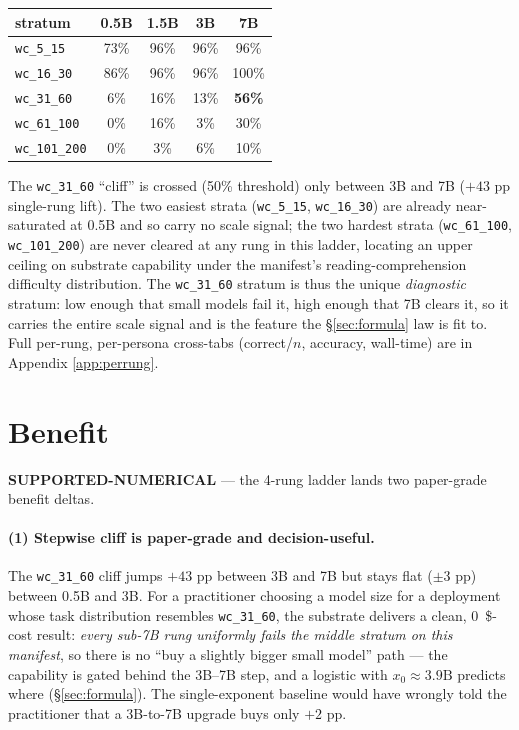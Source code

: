 \documentclass[11pt,a4paper]{article}
\newcommand{\green}[1]{\textcolor{green!50!black}{\textbf{#1}}}
\begin{document}
\begin{center}
\begin{tabular}{lcccc}
\toprule
stratum         & 0.5B  & 1.5B  & 3B    & 7B \\
\midrule
\texttt{wc\_5\_15}     & 73\% & 96\% & 96\% & 96\% \\
\texttt{wc\_16\_30}    & 86\% & 96\% & 96\% & 100\% \\
\texttt{wc\_31\_60}    & 6\%  & 16\% & 13\% & \textbf{56\%} \\
\texttt{wc\_61\_100}   & 0\%  & 16\% & 3\%  & 30\% \\
\texttt{wc\_101\_200}  & 0\%  & 3\%  & 6\%  & 10\% \\
\bottomrule
\end{tabular}
\end{center}

The \texttt{wc\_31\_60} ``cliff'' is crossed (50\% threshold) only between 3B
and 7B (\(+43\) pp single-rung lift). The two easiest strata
(\texttt{wc\_5\_15}, \texttt{wc\_16\_30}) are already near-saturated at 0.5B
and so carry no scale signal; the two hardest strata (\texttt{wc\_61\_100},
\texttt{wc\_101\_200}) are never cleared at any rung in this ladder, locating
an upper ceiling on substrate capability under the manifest's
reading-comprehension difficulty distribution. The \texttt{wc\_31\_60}
stratum is thus the unique \emph{diagnostic} stratum: low enough that small
models fail it, high enough that 7B clears it, so it carries the entire scale
signal and is the feature the §\ref{sec:formula} law is fit to. Full
per-rung, per-persona cross-tabs (correct/\(n\), accuracy, wall-time) are in
Appendix \ref{app:perrung}.

\section{Benefit}
\label{sec:benefit}
\green{SUPPORTED-NUMERICAL} --- the 4-rung ladder lands two paper-grade
benefit deltas.

\paragraph{(1) Stepwise cliff is paper-grade and decision-useful.} The
\texttt{wc\_31\_60} cliff jumps \(+43\) pp between 3B and 7B but stays flat
(\(\pm 3\) pp) between 0.5B and 3B. For a practitioner choosing a model size
for a deployment whose task distribution resembles \texttt{wc\_31\_60}, the
substrate delivers a clean, \SI{0}{\$}-cost result: \emph{every sub-7B rung
uniformly fails the middle stratum on this manifest}, so there is no
``buy a slightly bigger small model'' path --- the capability is gated behind
the 3B--7B step, and a logistic with \(x_0\approx 3.9\text{B}\) predicts
where (§\ref{sec:formula}). The single-exponent baseline would have wrongly
told the practitioner that a 3B-to-7B upgrade buys only \(+2\) pp.
\end{document}
